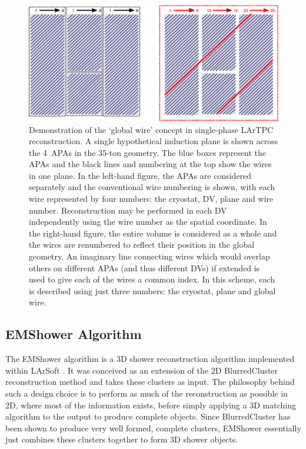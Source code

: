 \begin{figure}
  \centering
  \includegraphics[width=12cm]{GlobalWire.eps}
  \caption[Demonstration of the `global wire' concept in single-phase LArTPC reconstruction.]{Demonstration of the `global wire' concept in single-phase LArTPC reconstruction.  A single hypothetical induction plane is shown across the 4~APAs in the 35-ton geometry.  The blue boxes represent the APAs and the black lines and numbering at the top show the wires in one plane.  In the left-hand figure, the APAs are considered separately and the conventional wire numbering is shown, with each wire represented by four numbers: the cryostat, DV, plane and wire number.  Reconstruction may be performed in each DV independently using the wire number as the spatial coordinate.  In the right-hand figure, the entire volume is considered as a whole and the wires are renumbered to reflect their position in the global geometry.  An imaginary line connecting wires which would overlap others on different APAs (and thus different DVs) if extended is used to give each of the wires a common index.  In this scheme, each is described using just three numbers: the cryostat, plane and global wire.}
  \label{fig:GlobalWire}
\end{figure}

\subsection{EMShower Algorithm}\label{sec:EMShower}

The EMShower algorithm is a 3D shower reconstruction algorithm implemented within LArSoft \cite{EMShower,EMShowerLArSoft}.  It was conceived as an extension of the 2D BlurredCluster reconstruction method and takes these clusters as input.  The philosophy behind such a design choice is to perform as much of the reconstruction as possible in 2D, where most of the information exists, before simply applying a 3D matching algorithm to the output to produce complete objects.  Since BlurredCluster has been shown to produce very well formed, complete clusters, EMShower essentially just combines these clusters together to form 3D shower objects.

